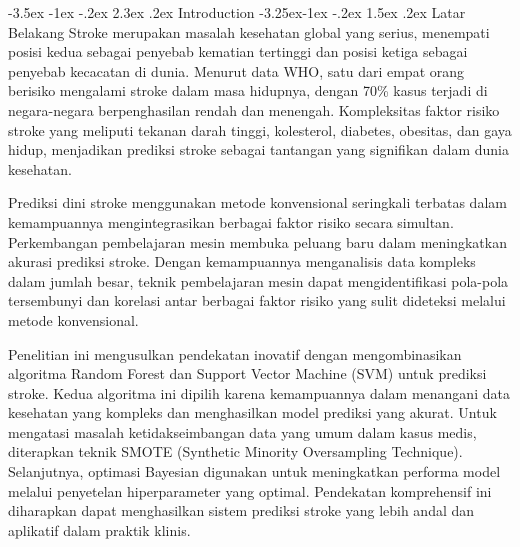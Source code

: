 \documentclass[10pt]{article}
\makeatletter
\renewcommand\section{\@startsection{section}{1}{\z@}%
  {-3.5ex \@plus -1ex \@minus -.2ex}%
  {2.3ex \@plus.2ex}%
  {\normalfont\normalsize\bfseries}}
\renewcommand\subsection{\@startsection{subsection}{2}{\z@}%
  {-3.25ex\@plus -1ex \@minus -.2ex}%
  {1.5ex \@plus .2ex}%
  {\normalfont\itshape\normalsize}}
\makeatother
\begin{document}

\begin{multicols}{2}
    \setlength{\columnsep}{0.4pt} %
    \raggedcolumns%
    \sloppy

    \section{Introduction}
    \subsection{Latar Belakang}
    Stroke merupakan masalah kesehatan global yang serius, menempati posisi kedua
    sebagai penyebab kematian tertinggi dan posisi ketiga sebagai penyebab
    kecacatan di dunia. Menurut data WHO, satu dari empat orang berisiko mengalami
    stroke dalam masa hidupnya, dengan 70\% kasus terjadi di negara-negara
    berpenghasilan rendah dan menengah\cite{who2024stroke}. Kompleksitas faktor
    risiko stroke yang meliputi tekanan darah tinggi, kolesterol, diabetes,
    obesitas, dan gaya hidup, menjadikan prediksi stroke sebagai tantangan yang
    signifikan dalam dunia kesehatan.\cite{emon2020performance}

    Prediksi dini stroke menggunakan metode konvensional seringkali terbatas dalam
    kemampuannya mengintegrasikan berbagai faktor risiko secara simultan.
    Perkembangan pembelajaran mesin membuka peluang baru dalam meningkatkan akurasi
    prediksi stroke. Dengan kemampuannya menganalisis data kompleks dalam jumlah
    besar, teknik pembelajaran mesin dapat mengidentifikasi pola-pola tersembunyi
    dan korelasi antar berbagai faktor risiko yang sulit dideteksi melalui metode
    konvensional.

    Penelitian ini mengusulkan pendekatan inovatif dengan mengombinasikan algoritma
    Random Forest dan Support Vector Machine (SVM) untuk prediksi stroke. Kedua
    algoritma ini dipilih karena kemampuannya dalam menangani data kesehatan yang
    kompleks dan menghasilkan model prediksi yang akurat. Untuk mengatasi masalah
    ketidakseimbangan data yang umum dalam kasus medis, diterapkan teknik SMOTE
    (Synthetic Minority Oversampling Technique). Selanjutnya, optimasi Bayesian
    digunakan untuk meningkatkan performa model melalui penyetelan hiperparameter
    yang optimal. Pendekatan komprehensif ini diharapkan dapat menghasilkan sistem
    prediksi stroke yang lebih andal dan aplikatif dalam praktik klinis.


\end{multicols}
\end{document}
